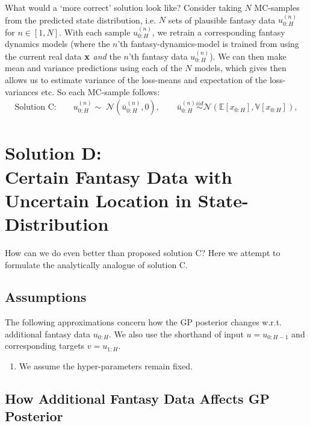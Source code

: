 \documentclass[a4paper,10pt]{article}
\newcommand{\N}{\mathcal{N}}
\newcommand{\E}{\mathbb{E}}
\newcommand{\V}{\mathbb{V}}
\newcommand{\x}{{\bf x}}
\begin{document}
What would a `more correct' solution look like?
Consider taking $N$ MC-samples from the predicted state distribution,
i.e. $N$ sets of plausible fantasy data $u_{0:H}^{(n)}$ for $n \in [1,N]$.
With each sample $u_{0:H}^{(n)}$, we retrain a corresponding fantasy dynamics models
(where the $n$'th fantasy-dynamics-model is trained from using the current real data
$\x$ \textit{and} the $n$'th fantasy data $u_{0:H}^{(n)}$).
We can then make mean and variance predictions using each of the $N$ models,
which gives then allows us to estimate variance of the loss-means and expectation of the loss-variances etc.
So each MC-sample follows:
\begin{eqnarray}
 \text{Solution C:} \quad\quad u_{0:H}^{(n)} \sim \; \N(\bar{u}_{0:H}^{(n)},0), \quad\quad
 \bar{u}_{0:H}^{(n)} \stackrel{iid}{\sim} \N(\E[x_{0:H}],\V[x_{0:H}]),
\end{eqnarray}

\section{Solution D: \\ \small{Certain Fantasy Data with Uncertain Location in State-Distribution}}

How can we do even better than proposed solution C?
Here we attempt to formulate the analytically analogue of solution C.

\subsection{Assumptions}

The following approximations concern how the GP posterior changes
w.r.t. additional fantasy data $u_{0:H}$.
We also use the shorthand of
input $u=u_{0:H-1}$ and
corresponding targets $v=u_{1:H}$.
\begin{enumerate} \itemsep0em
 \item We assume the hyper-parameters remain fixed.
\end{enumerate}

\subsection{How Additional Fantasy Data Affects GP Posterior}\label{sec:affectGP}
\end{document}
